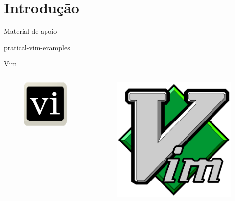 \section{Introdução}

\begin{frame}{Material de apoio}

    \vfill

    \hyperlink{https://media.pragprog.com/titles/dnvim2/code/dnvim2-code.zip}{pratical-vim-examples}
\end{frame}

\begin{frame}{Vim}
    \begin{columns}
        \begin{column}{0.3\textwidth}
            \begin{figure}
                \centering
                \includegraphics[height=0.6\linewidth]{Image/vi-logo.png}
                \label{vi-logo}
            \end{figure}
        \end{column}
        
        \begin{column}{0.3\textwidth}
            \begin{figure}
                \centering
                \includegraphics[height=0.6\linewidth]{Image/vim-logo.png}
                \label{vim-logo}
            \end{figure}
        \end{column}
        

\end{columns}
\end{frame}
